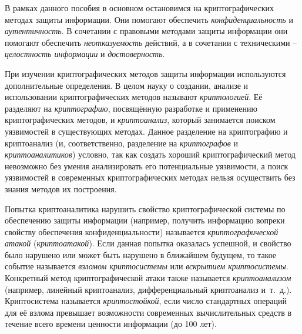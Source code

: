 В рамках данного пособия в основном остановимся на криптографических методах защиты информации. Они помогают обеспечить \emph{конфиденциальность} и \emph{аутентичность}. В сочетании с правовыми методами защиты информации они помогают обеспечить \emph{неотказуемость} действий, а в сочетании с техническими -- \emph{целостность информации} и \emph{достоверность}.

При изучении криптографических методов защиты информации используются дополнительные определения. В целом науку о создании, анализе и использовании криптографических методов называют \emph{криптологией}. Её разделяют на \emph{криптографию}, посвящённую разработке и применению криптографических методов, и \emph{криптоанализ}, который занимается поиском уязвимостей в существующих методах. Данное разделение на криптографию и криптоанализ (и, соответственно, разделение на \emph{криптографов} и \emph{криптоаналитиков}) условно, так как создать хороший криптографический метод невозможно без умения анализировать его потенциальные уязвимости, а поиск уязвимостей в современных криптографических методах нельзя осуществить без знания методов их построения.

Попытка криптоаналитика нарушить свойство криптографической системы по обеспечению защиты информации (например, получить информацию вопреки свойству обеспечения конфиденциальности) называется \emph{криптографической атакой} (\emph{криптоатакой}). Если данная попытка оказалась успешной, и свойство было нарушено или может быть нарушено в ближайшем будущем, то такое событие называется \emph{взломом криптосистемы} или \emph{вскрытием криптосистемы}. Конкретный метод криптографической атаки также называется \emph{криптоанализом} (например, линейный криптоанализ, дифференциальный криптоанализ и~т.~д.). Криптосистема называется \emph{криптостойкой}, если число стандартных операций для её взлома превышает возможности современных вычислительных средств в течение всего времени ценности информации (до 100 лет).


